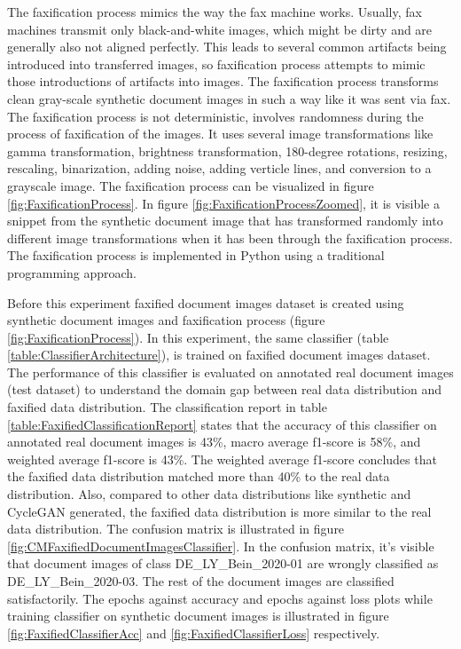 The faxification process mimics the way the fax machine works. Usually, fax machines transmit only black-and-white images, which might be dirty and are generally also not aligned perfectly. This leads to several common artifacts being introduced into transferred images, so faxification process attempts to mimic those introductions of artifacts into images. The faxification process transforms clean gray-scale synthetic document images in such a way like it was sent via fax. The faxification process is not deterministic, involves randomness during the process of faxification of the images. It uses several image transformations like gamma transformation, brightness transformation, 180-degree rotations, resizing, rescaling, binarization, adding noise, adding verticle lines, and conversion to a grayscale image. The faxification process can be visualized in figure \ref{fig:FaxificationProcess}. In figure \ref{fig:FaxificationProcessZoomed}, it is visible a snippet from the synthetic document image that has transformed randomly into different image transformations when it has been through the faxification process. The faxification process is implemented in Python using a traditional programming approach.

Before this experiment faxified document images dataset is created using synthetic document images and faxification process (figure \ref{fig:FaxificationProcess}). In this experiment, the same classifier (table \ref{table:ClassifierArchitecture}), is trained on faxified document images dataset. The performance of this classifier is evaluated on annotated real document images (test dataset) to understand the domain gap between real data distribution and faxified data distribution. The classification report in table \ref{table:FaxifiedClassificationReport} states that the accuracy of this classifier on annotated real document images is 43\%, macro average f1-score is  58\%, and weighted average f1-score is 43\%. The weighted average f1-score concludes that the faxified data distribution matched more than 40\% to the real data distribution. Also, compared to other data distributions like synthetic and \ac{CycleGAN} generated, the faxified data distribution is more similar to the real data distribution. The confusion matrix is illustrated in figure \ref{fig:CMFaxifiedDocumentImagesClassifier}. In the confusion matrix, it's visible that document images of class DE\_LY\_Bein\_2020-01 are wrongly classified as DE\_LY\_Bein\_2020-03. The rest of the document images are classified satisfactorily. The epochs against accuracy and epochs against loss plots while training classifier on synthetic document images is illustrated in figure \ref{fig:FaxifiedClassifierAcc} and \ref{fig:FaxifiedClassifierLoss} respectively.

